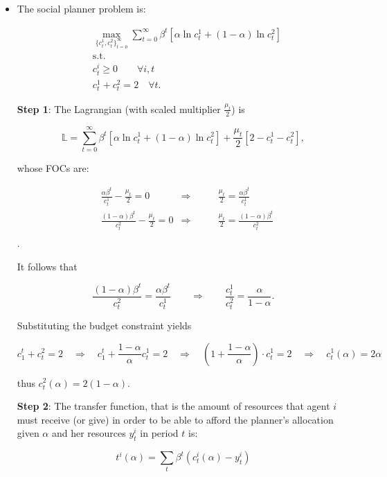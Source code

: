 \documentclass[12pt,a4paper]{article}
\begin{document}
\begin{itemize}

  \item The social planner problem is:

    \begin{align*}
      & \max_{\{ c_t^1, c_t^2 \}^{\infty}_{t = 0}} \sum^\infty_{t=0} \beta^t [\alpha \ln c_t^1 + (1-\alpha) \ln c_t^2] \\
      & \text{s.t.} \\
      & c_t^i \geq 0 \qquad \forall i, t \\
      & c^1_t + c^2_t = 2 \quad \forall t.
    \end{align*}

    \textbf{Step 1}: The Lagrangian (with scaled multiplier $\frac{\mu_t}{2}$) is

    $$
      \mathbb{L} = \sum^\infty_{t=0} \beta^t [\alpha \ln c_t^1 + (1-\alpha) \ln c_t^2] + \frac{\mu_t}{2} [2 - c_t^1 - c_t^2],
    $$

    whose FOCs are:

    \begin{align*}
      & \frac{\alpha \beta^t}{c_t^1} - \frac{\mu_t}{2} = 0 & \Rightarrow & \qquad \frac{\mu_t}{2} = \frac{\alpha \beta^t  }{c_t^1} \\
      & \frac{(1 - \alpha) \beta^t}{c_t^2} - \frac{\mu_t}{2} = 0 & \Rightarrow & \qquad \frac{\mu_t}{2} = \frac{(1 - \alpha) \beta^t}{c_t^2} \\
    \end{align*}.

    It follows that

    $$
    \frac{(1 - \alpha)\beta^t}{c_t^2} = \frac{\alpha \beta^t  }{c_t^1} \qquad \Rightarrow \qquad \frac{c_t^1}{c_t^2} = \frac{\alpha}{1 - \alpha}.
    $$

    Substituting the budget constraint yields

    $$
      c_1^t + c_t^2 = 2 \quad \Rightarrow \quad c_1^t + \frac{1 - \alpha}{\alpha} c_t^1 = 2 \quad \Rightarrow \quad \left(1 + \frac{1 - \alpha}{\alpha} \right) \cdot c_t^1 = 2 \quad \Rightarrow \quad c_t^1 (\alpha) = 2 \alpha
    $$

    thus $c_t^2 (\alpha) = 2(1-\alpha)$.

    \textbf{Step 2}: The transfer function, that is the amount of resources that agent $i$ must receive (or give) in order to be able to afford the planner's allocation given $\alpha$ and her resources $y^i_t$ in period $t$ is:

      $$
      t^i(\alpha) = \sum_{t} \beta^t \left( c_t^i(\alpha)- y_t^i \right)
      $$


\end{itemize}
\end{document}
